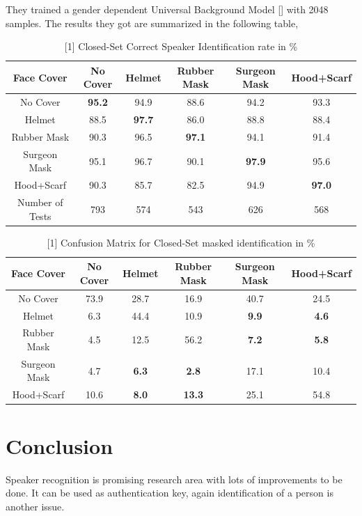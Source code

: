 \documentclass[12pt]{scrartcl}
\begin{document}
\pagebreak

They trained a gender dependent Universal Background Model [] with 2048
samples. The results they got are summarized in the following table,

\begin{table}[h]
	\label{Table-1}
	\centering
	\begin{tabular}{ | c | c c c c c | }
		\hline
			Face Cover & No Cover & Helmet & Rubber Mask & Surgeon Mask & Hood+Scarf \\
		\hline
			No Cover & \textbf{95.2} & 94.9 & 88.6 & 94.2 & 93.3\\
			Helmet & 88.5 & \textbf{97.7} & 86.0 & 88.8 & 88.4\\
			Rubber Mask & 90.3 & 96.5 & \textbf{97.1} & 94.1 & 91.4\\
			Surgeon Mask & 95.1 & 96.7 & 90.1 & \textbf{97.9} & 95.6\\
			Hood+Scarf & 90.3 & 85.7 & 82.5 & 94.9 & \textbf{97.0}\\
		\hline
			Number of Tests & 793 & 574 & 543 & 626 & 568\\	
		\hline											
	\end{tabular}
	\caption{[1] Closed-Set Correct Speaker Identification rate in \%}
\end{table}	

\begin{table}[h]
	\label{Table-1}
	\centering
	\begin{tabular}{ | c | c c c c c | }
		\hline
			Face Cover & No Cover & Helmet & Rubber Mask & Surgeon Mask & Hood+Scarf \\
		\hline
			No Cover & 73.9 & 28.7 & 16.9 & 40.7 & 24.5\\
			Helmet & 6.3 & 44.4 & 10.9 & \textbf{9.9} & \textbf{4.6}\\
			Rubber Mask & 4.5 & 12.5 & 56.2 & \textbf{7.2} & \textbf{5.8}\\
			Surgeon Mask & 4.7 & \textbf{6.3} & \textbf{2.8} & 17.1 & 10.4\\
			Hood+Scarf & 10.6 & \textbf{8.0} & \textbf{13.3} & 25.1 & 54.8\\
		\hline
	\end{tabular}
	\caption{ [1] Confusion Matrix for Closed-Set masked identification in \%}
\end{table}

\pagebreak

\section{Conclusion}
Speaker recognition is promising research area with lots of improvements to be
done. It can be used as authentication key, again identification of a person is another
issue.\\
\end{document}
